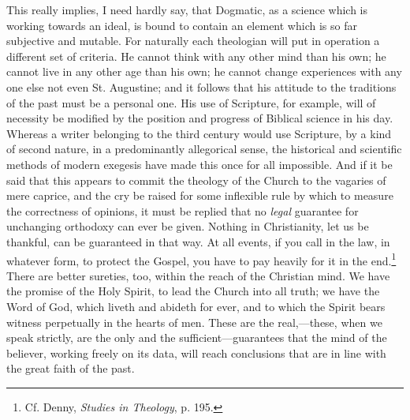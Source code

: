 \documentclass[12pt,a5paper]{article}
\begin{document}
This really implies, I need hardly say, that Dogmatic, as
a science which is working towards an ideal, is bound to
contain an element which is so far subjective and mutable.
For naturally each theologian will put in operation a different
set of criteria. He cannot think with any other
mind than his own; he cannot live in any other age than
his own; he cannot change experiences with any one else
not even St. Augustine; and it follows that his attitude to
the traditions of the past must be a personal one. His
use of Scripture, for example, will of necessity be modified
by the position and progress of Biblical science in his day.
Whereas a writer belonging to the third century would use
Scripture, by a kind of second nature, in a predominantly
allegorical sense, the historical and scientific methods of
modern exegesis have made this once for all impossible.
And if it be said that this appears to commit the theology
of the Church to the vagaries of mere caprice, and the cry
be raised for some inflexible rule by which to measure the
correctness of opinions, it must be replied that no \textit{legal}
guarantee for unchanging orthodoxy can ever be given.
Nothing in Christianity, let us be thankful, can be guaranteed
in that way. At all events, if you call in the law, in
whatever form, to protect the Gospel, you have to pay
heavily for it in the end.\footnote{
Cf. Denny, \textit{Studies in Theology}, p. 195.
} 
There are better sureties, too,
within the reach of the Christian mind. We have the
promise of the Holy Spirit, to lead the Church into all truth;
we have the Word of God, which liveth and abideth for
ever, and to which the Spirit bears witness perpetually in
the hearts of men. These are the real,---these, when we speak
strictly, are the only and the sufficient---guarantees that the
mind of the believer, working freely on its data, will reach
conclusions that are in line with the great faith of the
past.
\end{document}
